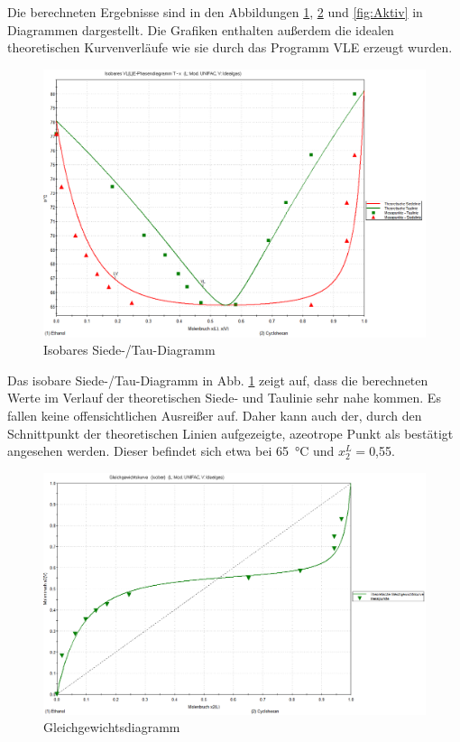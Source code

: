  Die berechneten Ergebnisse sind in den Abbildungen \ref{fig:T-x2-isobar}, \ref{fig:gleichgewichtsdiagramm} und \ref{fig:Aktiv} in Diagrammen dargestellt. Die Grafiken enthalten außerdem die idealen theoretischen Kurvenverläufe wie sie durch das Programm VLE erzeugt wurden.
\begin{figure}[h!]
	\centering
	\includegraphics[width=1.1\linewidth]{img/VLE-T-x-isobar}
	\caption{Isobares Siede-/Tau-Diagramm}
	\label{fig:T-x2-isobar}
\end{figure}
Das isobare Siede-/Tau-Diagramm in Abb. \ref{fig:T-x2-isobar} zeigt auf, dass die berechneten Werte im Verlauf der theoretischen Siede- und Taulinie sehr nahe kommen. Es fallen keine offensichtlichen Ausreißer auf. Daher kann auch der, durch den Schnittpunkt der theoretischen Linien aufgezeigte, azeotrope Punkt als bestätigt angesehen werden. Dieser befindet sich etwa bei \SI{65}{\degreeCelsius} und $x_2^L=$0,55.
\begin{figure}[h!]
	\centering
	\includegraphics[width=1.1\linewidth]{img/gleichgewichtsdiagramm}
	\caption{Gleichgewichtsdiagramm}
	\label{fig:gleichgewichtsdiagramm}
\end{figure}
